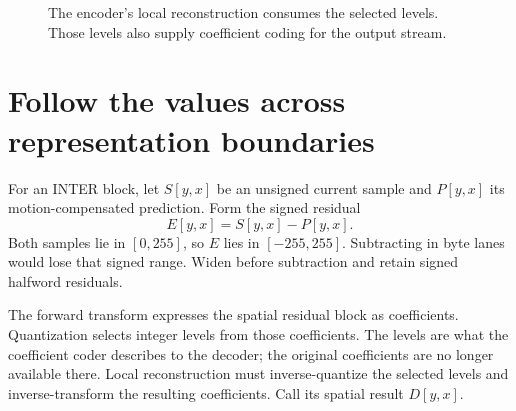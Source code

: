 \begin{figure}[htbp]
  \centering
  \caption{The encoder's local reconstruction consumes the selected levels. Those levels also supply coefficient coding for the output stream.}
  \label{revision:local-reconstruction}
\end{figure}

\section{Follow the values across representation boundaries}

For an INTER block, let $S[y,x]$ be an unsigned current sample and $P[y,x]$ its
motion-compensated prediction. Form the signed residual
\[
  E[y,x]=S[y,x]-P[y,x].
\]
Both samples lie in $[0,255]$, so $E$ lies in $[-255,255]$. Subtracting in byte
lanes would lose that signed range. Widen before subtraction and retain signed
halfword residuals.

The forward transform expresses the spatial residual block as coefficients.
Quantization selects integer levels from those coefficients. The levels are what
the coefficient coder describes to the decoder; the original coefficients are no
longer available there. Local reconstruction must inverse-quantize the selected
levels and inverse-transform the resulting coefficients. Call its spatial result
$D[y,x]$.

